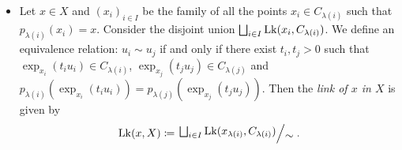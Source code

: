 \begin{defin}
\begin{itemize}
  \item Let \(x \in X\) and \((x_i)_{i \in I}\) be the family of all the points \(x_i \in C_{\lambda(i)}\) such that \(p_{\lambda(i)}(x_i) = x\). Consider the disjoint union \(\bigsqcup_{i \in I} \operatorname{Lk}(x_i, C_{\lambda(i)})\). We define an equivalence relation: \(u_i \sim u_j\) if and only if there exist \(t_i, t_j > 0\) such that \(\exp_{x_i}(t_i u_i) \in C_{\lambda(i)}\), \(\exp_{x_j}(t_j u_j) \in C_{\lambda(j)}\) and \(p_{\lambda(i)}(\exp_{x_i}(t_i u_i)) = p_{\lambda(j)}(\exp_{x_j}(t_j u_j))\). Then the \emph{link of \(x\) in \(X\)} is given by
    \begin{align*}
      \lk(x, X) \coloneqq \quot{\bigsqcup_{i \in I} \lk(x_{\lambda(i)}, C_{\lambda(i)})}{\sim}.
    \end{align*}
  \end{itemize}
\end{defin}

